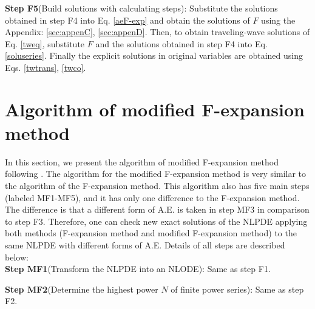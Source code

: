 \documentclass[prd,aps,floats,showkeys,nofootinbib,notitlepage]{revtex4}
\begin{document}
	\textbf{Step F5}(Build solutions with calculating steps): Substitute the solutions obtained in step F4 into Eq. \eqref{aeF-exp}  and obtain the solutions of $F$ using the Appendix: \ref{sec:appenC}, \ref{sec:appenD}. Then, to obtain traveling-wave solutions of Eq. \eqref{tweq}, substitute $F$ and the solutions obtained in step F4 into Eq. \eqref{soluseries}. Finally the explicit solutions in original variables are obtained using Eqs. \eqref{twtrans}, \eqref{twco}.\\
	

	
	
	\section{Algorithm of modified F-expansion method}\label{sec:mF}
	In this section, we present the algorithm of modified F-expansion method following \cite{modfexpn}.
	The algorithm for the modified F-expansion method \cite{modfexpn} is very similar to the algorithm of the F-expansion method. This algorithm also has five main steps (labeled MF1-MF5), and it has only one difference to the F-expansion method. The difference is that a different form of A.E. is taken in step MF3 in comparison to step F3. Therefore, one can check new exact solutions of the NLPDE applying both methods (F-expansion method and modified F-expansion method) to the same NLPDE with different forms of A.E. Details of all steps are described below:\\ 
	
	\textbf{Step MF1}(Transform the NLPDE into an NLODE): Same as step F1.
	
	\textbf{Step MF2}(Determine the highest power $N$ of finite power series):  Same as step F2.
	
\end{document}
